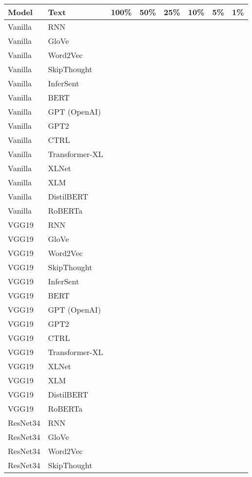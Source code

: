 \documentclass[11pt,a4paper]{article}
\begin{document}
\begin{table*}[t!]
\centering
\begin{tabular}{llcccccc}
\hline
\textbf{Model} & \textbf{Text} & \textbf{100\%} & \textbf{50\%} & \textbf{25\%} & \textbf{10\%} & \textbf{5\%} & \textbf{1\%} \\
\hline
Vanilla & RNN & & & & & & \\
Vanilla & GloVe & & & & & & \\
Vanilla & Word2Vec & & & & & & \\
Vanilla & SkipThought & & & & & & \\
Vanilla & InferSent & & & & & & \\
Vanilla & BERT & & & & & & \\
Vanilla & GPT (OpenAI) & & & & & & \\
Vanilla & GPT2 & & & & & & \\
Vanilla & CTRL & & & & & & \\
Vanilla & Transformer-XL & & & & & & \\
Vanilla & XLNet & & & & & & \\
Vanilla & XLM & & & & & & \\
Vanilla & DistilBERT & & & & & & \\
Vanilla & RoBERTa & & & & & & \\
VGG19 & RNN & & & & & & \\
VGG19 & GloVe & & & & & & \\
VGG19 & Word2Vec & & & & & & \\
VGG19 & SkipThought & & & & & & \\
VGG19 & InferSent & & & & & & \\
VGG19 & BERT & & & & & & \\
VGG19 & GPT (OpenAI) & & & & & & \\
VGG19 & GPT2 & & & & & & \\
VGG19 & CTRL & & & & & & \\
VGG19 & Transformer-XL & & & & & & \\
VGG19 & XLNet & & & & & & \\
VGG19 & XLM & & & & & & \\
VGG19 & DistilBERT & & & & & & \\
VGG19 & RoBERTa & & & & & & \\
ResNet34 & RNN & & & & & & \\
ResNet34 & GloVe & & & & & & \\
ResNet34 & Word2Vec & & & & & & \\
ResNet34 & SkipThought & & & & & & \\

\end{tabular}
\end{table*}
\end{document}
